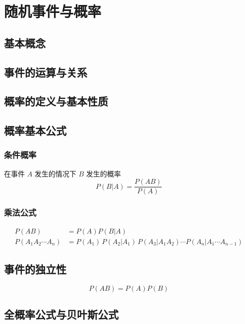 \chapter{随机事件与概率}

\section{基本概念}
\label{sec:基本概念}

\section{事件的运算与关系}
\label{sec:事件的运算与关系}

\section{概率的定义与基本性质}
\label{sec:概率的定义与基本性质}

\section{概率基本公式}
\label{sec:概率基本公式}

\subsection{条件概率}
\label{sub:条件概率}


在事件 $A$ 发生的情况下 $B$ 发生的概率
\[
	P(B|A) = \frac{P(AB)}{P(A)}
\]

\subsection{乘法公式}
\label{sub:乘法公式}

\[
	\begin{aligned}
		P(AB)                 & = P(A) P(B |  A)                                                               \\
		P(A_1 A_2 \cdots A_n) & = P(A_1)\, P(A_2 | A_1) \, P(A_3 | A_1 A_2) \cdots P(A_n | A_1 \cdots A_{n-1}) 
	\end{aligned}
\]

\section{事件的独立性}
\label{sec:事件的独立性}

\[
	P(AB) = P(A) P(B)
\]

\section{全概率公式与贝叶斯公式}
\label{sec:全概率公式与贝叶斯公式}

